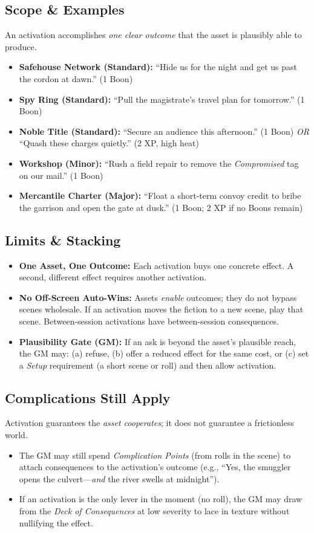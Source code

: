 \documentclass[12pt]{book}
\begin{document}
\subsection*{Scope \& Examples}
An activation accomplishes \emph{one clear outcome} that the asset is plausibly able to produce.
\begin{itemize}
  \item \textbf{Safehouse Network (Standard):} ``Hide us for the night and get us past the cordon at dawn.'' (1 Boon)
  \item \textbf{Spy Ring (Standard):} ``Pull the magistrate’s travel plan for tomorrow.'' (1 Boon)
  \item \textbf{Noble Title (Standard):} ``Secure an audience this afternoon.'' (1 Boon) \emph{OR} ``Quash these charges quietly.'' (2 XP, high heat)
  \item \textbf{Workshop (Minor):} ``Rush a field repair to remove the \emph{Compromised} tag on our mail.'' (1 Boon)
  \item \textbf{Mercantile Charter (Major):} ``Float a short-term convoy credit to bribe the garrison and open the gate at dusk.'' (1 Boon; 2 XP if no Boons remain)
\end{itemize}

\subsection*{Limits \& Stacking}
\begin{itemize}
  \item \textbf{One Asset, One Outcome:} Each activation buys one concrete effect. A second, different effect requires another activation.
  \item \textbf{No Off-Screen Auto-Wins:} Assets \emph{enable} outcomes; they do not bypass scenes wholesale. If an activation moves the fiction to a new scene, play that scene. Between-session activations have between-session consequences. 
  \item \textbf{Plausibility Gate (GM):} If an ask is beyond the asset’s plausible reach, the GM may: (a) refuse, (b) offer a reduced effect for the same cost, or (c) set a \emph{Setup} requirement (a short scene or roll) and then allow activation.
\end{itemize}

\subsection*{Complications Still Apply}
Activation guarantees the \emph{asset cooperates}; it does not guarantee a frictionless world.
\begin{itemize}
  \item The GM may still spend \emph{Complication Points} (from rolls in the scene) to attach consequences to the activation’s outcome (e.g., ``Yes, the smuggler opens the culvert—\emph{and} the river swells at midnight'').
  \item If an activation is the only lever in the moment (no roll), the GM may draw from the \emph{Deck of Consequences} at low severity to lace in texture without nullifying the effect.
\end{itemize}
\end{document}
